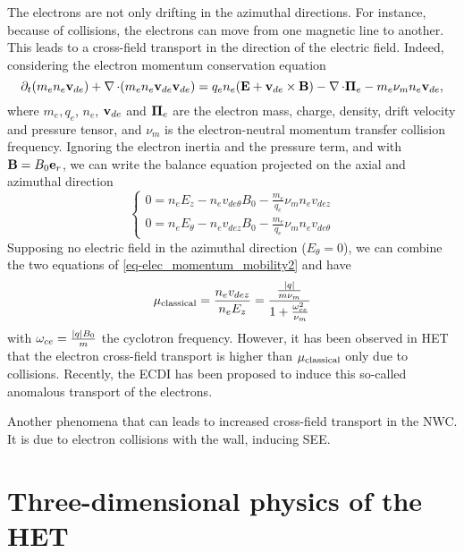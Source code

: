     \label{sec-mob}
    The electrons are not only drifting in the azimuthal directions.
    For instance, because of collisions, the electrons can move from one magnetic line to another.
    This leads to a cross-field transport in the direction of the electric field.
    Indeed, considering the electron momentum conservation equation \citep{lafleur2016a}
    \begin{equation} \label{eq-elec_momentum_mobility}
      \partial_t(m_e n_e {\mathbf v}_{de}) + \operatorname{{\mathbf \nabla}} \cdot (m_e n_e  {\mathbf v}_{de} {\mathbf v}_{de}) = q_e n_e ( {\mathbf E} + {\mathbf v}_{de} \times {\mathbf B}) - \operatorname{{\mathbf \nabla}} \cdot {\mathbf \Pi}_e - m_e \nu_m n_e {\mathbf v}_{de},
    \end{equation}
    where $m_e, q_e$, $n_e$, ${\mathbf v}_{de}$ and ${\mathbf \Pi}_e $ are the electron mass, charge, density, drift velocity and pressure tensor, and $\nu_m$ is the electron-neutral momentum transfer collision frequency.
    Ignoring the electron inertia and the pressure term, and with ${\mathbf B} = B_0 {\mathbf e}_r$, we can write the balance equation projected on the axial and azimuthal direction
    \begin{equation} \label{eq-elec_momentum_mobility2}
    \begin{cases}
      0 =  n_e E_z - n_e v_{de{\theta}} B_0 - \frac{m_e}{q_e} \nu_m n_e v_{dez}\\
      0 =  n_e E_{\theta} -  n_e v_{dez} B_0 - \frac{m_e}{q_e} \nu_m n_e v_{de{\theta}}
    \end{cases}
    \end{equation}
    Supposing no electric field in the azimuthal direction ($E_{\theta}=0$),  we can combine the two equations of \cref{eq-elec_momentum_mobility2} and have \citep{chen2006,meezan2001}
    \begin{equation} \label{eq-mobility}
      \mu_{\mathrm{classical}} = \frac{n_e v_{dez}}{n_e E_z} = \frac{ \frac{\lvert q\rvert}{m \nu_m}}{1 + \frac{\omega_{ce}^2}{\nu_m}}
    \end{equation}
    with $\omega_{ce}= \frac{\lvert q\rvert B_0}{m}$ the cyclotron frequency.
    However, it has been observed in \ac{HET} that the electron cross-field transport is higher than $\mu_{\mathrm{classical}}$ only due to collisions.
    Recently, the \ac{ECDI} has been proposed to induce this so-called anomalous transport of the electrons.

    Another phenomena that can leads to increased cross-field transport in the \ac{NWC}.
    It is due to electron collisions with the wall, inducing \ac{SEE}.


\section*{Three-dimensional physics of the HET}
  \label{sec-3Dphi}

